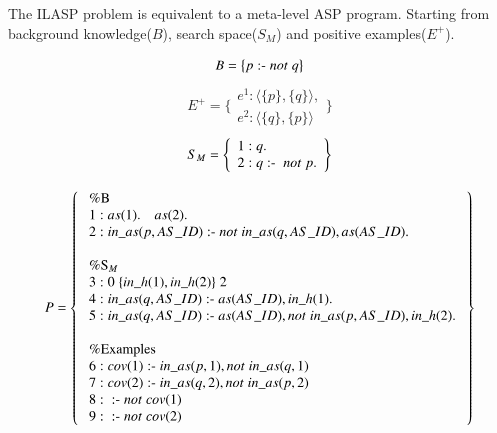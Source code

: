 The ILASP problem is equivalent to a meta-level ASP program.
Starting from background knowledge($B$), search space($S_M$) and positive examples($E^+$).
\begin{minipage}[t]{0.2\textwidth}
    \begin{equation*}
        B=\bigl\{p\;\text{:-}\; not\;q\bigr\}
    \end{equation*}
    \begin{equation*}
            E^+=\Biggl\{ 
                \begin{array}{l}
                    e^1: \langle\{p\},\{q\}\rangle,\\
                    e^2: \langle\{q\},\{p\}\rangle
                \end{array}
            \Biggr\}
    \end{equation*}
    \begin{equation*}
        S_M=\Biggl\{ 
            \begin{array}{l}
                1: q.\\
                2: q\;\text{:-}\;\;not\;p .
            \end{array}
        \Biggr\}
    \end{equation*}
\end{minipage}
\begin{minipage}[t]{0.7\textwidth}
    \begin{equation*}
        P=\cstpl{3.1cm}
            \begin{array}{l}
                \text{\%B}\\
                1: as(1).\quad as(2).\\
                2: in\_as(p, AS\_ID)\aspimply not\;in\_as(q, AS\_ID),as(AS\_ID).\\\\
                
                \text{\%S}_M\\
                3: 0\;\{in\_h(1), in\_h(2)\}\;2\\
                4: in\_as(q, AS\_ID)\aspimply as(AS\_ID), in\_h(1).\\
                5: in\_as(q, AS\_ID)\aspimply as(AS\_ID),not\;in\_as(p, AS\_ID), in\_h(2).\\\\
                
                \text{\%Examples}\\
                6:cov(1)\aspimply in\_as(p, 1),not\;in\_as(q, 1)\\
                7:cov(2)\aspimply in\_as(q, 2),not\;in\_as(p, 2)\\
                8:\aspimply not\;cov(1)\\
                9:\aspimply not\;cov(2)
            \end{array}
        \cstpr{3.1cm}
    \end{equation*}
\end{minipage}\\


